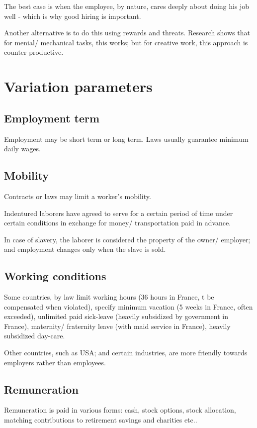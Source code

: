 \documentclass[oneside, article]{memoir}
\begin{document}
The best case is when the employee, by nature, cares deeply about doing his job well - which is why good hiring is important.

Another alternative is to do this using rewards and threats. Research shows that for menial/ mechanical tasks, this works; but for creative work, this approach is counter-productive.

\section{Variation parameters}
\subsection{Employment term}
Employment may be short term or long term. Laws usually guarantee minimum daily wages.

\subsection{Mobility}
Contracts or laws may limit a worker's mobility.

Indentured laborers have agreed to serve for a certain period of time under certain conditions in exchange for money/ transportation paid in advance.

In case of slavery, the laborer is considered the property of the owner/ employer; and employment changes only when the slave is sold.

\subsection{Working conditions}
Some countries, by law limit working hours (36 hours in France, t be compensated when violated), specify minimum vacation (5 weeks in France, often exceeded), unlimited paid sick-leave (heavily subsidized by government in France), maternity/ fraternity leave (with maid service in France), heavily subsidized day-care.

Other countries, such as USA; and certain industries, are more friendly towards employers rather than employees.

\subsection{Remuneration}
Remuneration is paid in various forms: cash, stock options, stock allocation, matching contributions to retirement savings and charities etc..
\end{document}
